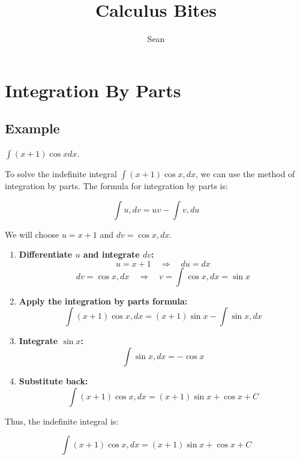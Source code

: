 \documentclass[a4paper,12pt]{book}
\begin{document}
	
\title{Calculus Bites}
\author{Sean}

\maketitle

\tableofcontents

\newpage

\chapter{Integration By Parts}

\section{Example}

\begin{pbox}
\( \int (x+1) \cos{x} dx \).
\end{pbox}

To solve the indefinite integral \( \int (x+1) \cos{x} , dx \), we can use the method of integration by parts. The formula for integration by parts is:

\[
\int u , dv = uv - \int v , du
\]

We will choose \( u = x + 1 \) and \( dv = \cos{x} , dx \).
\begin{enumerate}
\item 
\textbf{Differentiate \( u \) and integrate \( dv \):}
\[
u = x + 1 \quad \Rightarrow \quad du = dx
\]
\[
dv = \cos{x} , dx \quad \Rightarrow \quad v = \int \cos{x} , dx = \sin{x}
\]

\item 
\textbf{Apply the integration by parts formula:}
\[
\int (x+1) \cos{x} , dx = (x+1) \sin{x} - \int \sin{x} , dx
\]

\item 
\textbf{Integrate \( \sin{x} \):}
\[
\int \sin{x} , dx = -\cos{x}
\]

\item 
\textbf{Substitute back:}
\[
\int (x+1) \cos{x} , dx = (x+1) \sin{x} + \cos{x} + C
\]

\end{enumerate}

Thus, the indefinite integral is:

\[
\int (x+1) \cos{x} , dx = (x+1) \sin{x} + \cos{x} + C
\]
\end{document}

